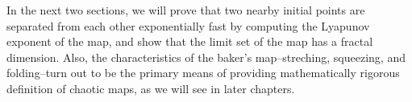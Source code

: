 %
%

In the next two sections, we will prove that two nearby initial points are separated from each other exponentially fast by computing the Lyapunov exponent of the map, and show that the limit set of the map has a fractal dimension.
Also, the characteristics of the baker's map--streching, squeezing, and folding--turn out to be the primary means of providing mathematically rigorous definition of chaotic maps, as we will see in later chapters.

